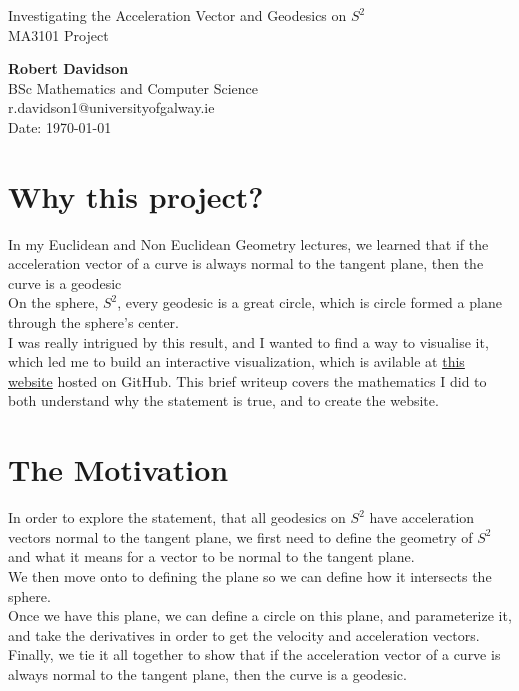 \documentclass[11pt]{article}
\begin{document}
\begin{center}
    \vspace{0.5cm}
    Investigating the Acceleration Vector and Geodesics on $S^2$\\
    MA3101 Project\\[24pt]
    \LARGE

    \Large
    \textbf{Robert Davidson}\\[6pt]
    \small
    BSc Mathematics and Computer Science \\ r.davidson1@universityofgalway.ie\\[6pt]
    Date: \today\\[12pt]
\end{center}

\vspace{1.5cm}

\section*{Why this project?}
In my Euclidean and Non Euclidean Geometry lectures, we learned that if the acceleration vector of a curve is always normal to the tangent plane, then the curve is a geodesic\\[0.5ex]
On the sphere, $S^2$, every geodesic is a great circle, which is circle formed a plane through the sphere's center. \\[0.5ex]
I was really intrigued by this result, and I wanted to find a way to visualise it, which led me to build an interactive visualization, which is avilable at \href{https://robertdavidson1.github.io/MA3101Project/}{this website} hosted on GitHub.
This brief writeup covers the mathematics I did to both understand why the statement is true, and to create the website. 

\section*{The Motivation}
In order to explore the statement, that all geodesics on $S^2$ have acceleration vectors normal to the tangent plane, we first need to define the geometry of $S^2$ and what it means for a vector to be normal to the tangent plane. \\[0.5ex] We then move onto to defining the plane so we can define how it intersects the sphere. \\[0.5ex]
Once we have this plane, we can define a circle on this plane, and parameterize it, and take the derivatives in order to get the velocity and acceleration vectors. \\[0.5ex]
Finally, we tie it all together to show that if the acceleration vector of a curve is always normal to the tangent plane, then the curve is a geodesic. 
\end{document}
